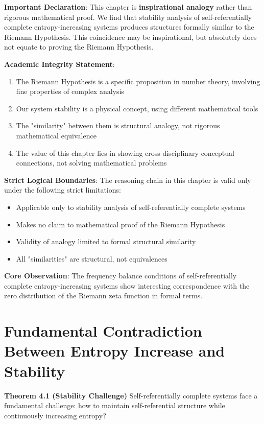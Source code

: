 
\textbf{Important Declaration}: This chapter is \textbf{inspirational analogy} rather than rigorous mathematical proof. We find that stability analysis of self-referentially complete entropy-increasing systems produces structures formally similar to the Riemann Hypothesis. This coincidence may be inspirational, but absolutely does not equate to proving the Riemann Hypothesis.

\textbf{Academic Integrity Statement}:
\begin{enumerate}
\item The Riemann Hypothesis is a specific proposition in number theory, involving fine properties of complex analysis
\item Our system stability is a physical concept, using different mathematical tools
\item The "similarity" between them is structural analogy, not rigorous mathematical equivalence
\item The value of this chapter lies in showing cross-disciplinary conceptual connections, not solving mathematical problems
\end{enumerate}

\textbf{Strict Logical Boundaries}:
The reasoning chain in this chapter is valid only under the following strict limitations:
\begin{itemize}
\item Applicable only to stability analysis of self-referentially complete systems
\item Makes no claim to mathematical proof of the Riemann Hypothesis
\item Validity of analogy limited to formal structural similarity
\item All "similarities" are structural, not equivalences
\end{itemize}

\textbf{Core Observation}: The frequency balance conditions of self-referentially complete entropy-increasing systems show interesting correspondence with the zero distribution of the Riemann zeta function in formal terms.

\section{Fundamental Contradiction Between Entropy Increase and Stability}
\label{sec:ch04_riemann:fundamental-contradiction-between-entropy-increase-and-stability}

\textbf{Theorem 4.1 (Stability Challenge)}
\label{thm:4.1}
Self-referentially complete systems face a fundamental challenge: how to maintain self-referential structure while continuously increasing entropy?

